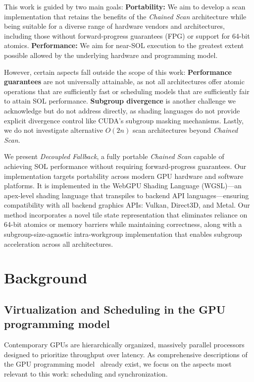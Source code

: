 \documentclass[sigconf,screen]{acmart}
\begin{document}
This work is guided by two main goals: \textbf{Portability:} We aim to develop a scan implementation that retains the benefits of the \emph{Chained Scan} architecture while being suitable for a diverse range of hardware vendors and architectures, including those without forward-progress guarantees (FPG) or support for 64-bit atomics. \textbf{Performance:} We aim for near-SOL execution to the greatest extent possible allowed by the underlying hardware and programming model.

However, certain aspects fall outside the scope of this work: \textbf{Performance guarantees} are not universally attainable, as not all architectures offer atomic operations that are sufficiently fast or scheduling models that are sufficiently fair to attain SOL performance. \textbf{Subgroup divergence} is another challenge we acknowledge but do not address directly, as shading languages do not provide explicit divergence control like CUDA's subgroup masking mechanisms. Lastly, we do not investigate alternative $O(2n)$ scan architectures beyond \emph{Chained Scan}.

We present \emph{Decoupled Fallback}, a fully portable \emph{Chained Scan} capable of achieving SOL performance without requiring forward-progress guarantees. Our implementation targets portability across modern GPU hardware and software platforms. It is implemented in the WebGPU Shading Language (WGSL)---an apex-level shading language that transpiles to backend API languages---ensuring compatibility with all backend graphics APIs: Vulkan, Direct3D, and Metal. Our method incorporates a novel tile state representation that eliminates reliance on 64-bit atomics or memory barriers while maintaining correctness, along with a subgroup-size-agnostic intra-workgroup implementation that enables subgroup acceleration across all architectures.

\section{Background}
\subsection{Virtualization and Scheduling in the GPU programming model}
Contemporary GPUs are hierarchically organized, massively parallel processors designed to prioritize throughput over latency. As comprehensive descriptions of the GPU programming model~\cite{10.1145/1365490.1365500} already exist, we focus on the aspects most relevant to this work: scheduling and synchronization.
\end{document}
